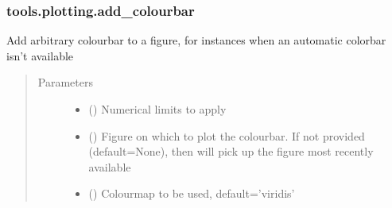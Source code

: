 \documentclass[letterpaper,10pt,english]{sphinxmanual}
\begin{document}
\subsubsection{tools.plotting.add\_colourbar}
\label{\detokenize{_autosummary/tools.plotting.add_colourbar:tools-plotting-add-colourbar}}\label{\detokenize{_autosummary/tools.plotting.add_colourbar::doc}}

\begin{fulllineitems}
\label{\detokenize{_autosummary/tools.plotting.add_colourbar:tools.plotting.add_colourbar}}
\sphinxAtStartPar
Add arbitrary colourbar to a figure, for instances when an automatic colorbar isn’t available
\begin{quote}\begin{description}
\item[{Parameters}] \leavevmode\begin{itemize}
\item {} 
\sphinxAtStartPar
{} () \textendash{} Numerical limits to apply

\item {} 
\sphinxAtStartPar
{} (\sphinxstyleliteralemphasis{\sphinxupquote{, }}) \textendash{} Figure on which to plot the colourbar. If not provided (default=None), then will pick up the figure most
recently available

\item {} 
\sphinxAtStartPar
{} (\sphinxstyleliteralemphasis{\sphinxupquote{, }}) \textendash{} Colourmap to be used, default=’viridis’


\end{itemize}
\end{description}
\end{quote}
\end{fulllineitems}
\end{document}
